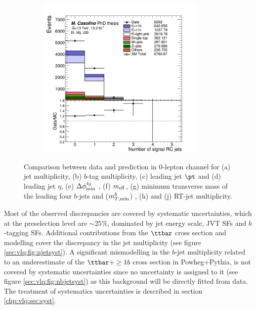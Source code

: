 \begin{figure}[p]
\begin{subfigure}{0.33\textwidth}
  \caption{}
  \label{}
\end{subfigure}
\begin{subfigure}{0.33\textwidth}
  \centering
  \includegraphics[width=0.9\textwidth]{figures/VLQ/presel/0lep/canv_c0l2b_RCjets_n.png}
  \caption{}
  \label{}
\end{subfigure}
\captionsetup{width=0.85\textwidth} \caption{\small Comparison between data and prediction in 0-lepton channel for (a) jet multiplicity, (b) $b$-tag multiplicity, (c) leading jet $\pt$ and (d) leading jet $\eta$, (e) $\Delta \phi_{\rm min}^{4j}$ , (f) $m_{\rm eff}$, (g) minimum transverse mass of the leading four $b$-jets and \MET ($m_{T,{\rm min}}^{b}$) , (h) \MET and (j) RT-jet multiplicity.}
\label{sec:vlq:fig:0ldatamc}
\end{figure}

Most of the observed discrepancies are covered by systematic uncertainties, which at the preselection level are
$\sim25\%$, dominated by jet energy scale, JVT SFs and $b$-tagging SFs. Additional contributions from the $\ttbar$ cross section and modelling cover the discrepancy in the jet multiplicity (see figure \ref{sec:vlq:fig:njetsyst}). A significant mismodelling in the $b$-jet multiplicity related to an underestimate of the $\ttbar+\ge1b$ cross section in {\sc Powheg+Pythia}, is not covered by systematic uncertainties since no uncertainty is assigned to it (see figure \ref{sec:vlq:fig:nbjetsyst}) as this background will be directly fitted from data. The treatment of systematics uncertainties is described in section \ref{chp:vlq:sec:syst}.


